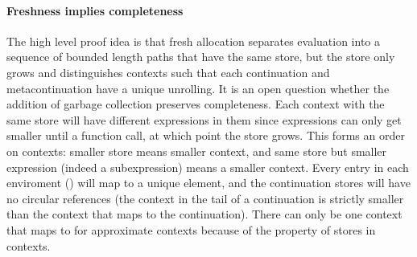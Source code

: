 \paragraph{Freshness implies completeness}
The high level proof idea is that fresh allocation separates evaluation into a sequence of bounded length paths that have the same store, but the store only grows and distinguishes contexts such that each continuation and metacontinuation have a unique unrolling.
It is an open question whether the addition of garbage collection preserves completeness.
Each context with the same store will have different expressions in them since expressions can only get smaller until a function call, at which point the store grows.
This forms an order on contexts: smaller store means smaller context, and same store but smaller expression (indeed a subexpression) means a smaller context.
Every entry in each enviroment () will map to a unique element, and the continuation stores will have no circular references (the context in the tail of a continuation is strictly smaller than the context that maps to the continuation).
There can only be one context that  maps to for approximate contexts because of the property of stores in contexts.

